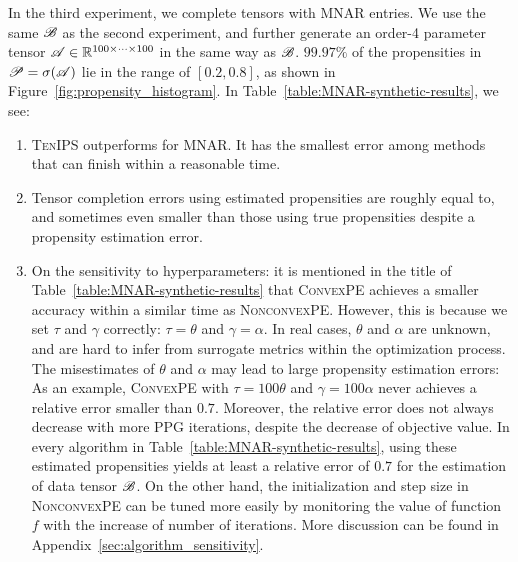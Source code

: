 \documentclass{article}
\newcommand{\T}[2][]{#1\mathscr{\MakeUppercase{#2}}}
\newcommand{\RR}{\mathbb{R}}
\theoremstyle{plain}
\begin{document}
In the third experiment, we complete tensors with MNAR entries. 
We use the same $\T{B}$ as the second experiment, and further generate an order-4 parameter tensor $\T{A} \in \RR^{100 \times \cdots \times 100}$ in the same way as $\T{B}$.
$99.97\%$ of the propensities in $\T{P} = \sigma(\T{A})$ lie in the range of $[0.2, 0.8]$, as shown in Figure~\ref{fig:propensity_histogram}.
In Table~\ref{table:MNAR-synthetic-results}, we see:
\begin{enumerate}[label=\arabic*, wide, labelwidth=!, labelindent=0pt]
	\item \textsc{TenIPS} outperforms for MNAR. 
	It has the smallest error among methods that can finish within a reasonable time.
	\item Tensor completion errors using estimated propensities are roughly equal to, and sometimes even smaller than those using true propensities despite a propensity estimation error. 
	\item On the sensitivity to hyperparameters: it is mentioned in the title of Table~\ref{table:MNAR-synthetic-results} that \textsc{ConvexPE} achieves a smaller accuracy within a similar time as \textsc{NonconvexPE}. 
	However, this is because we set $\tau$ and $\gamma$ correctly: $\tau=\theta$ and $\gamma =\alpha$.
	In real cases, $\theta$ and $\alpha$ are unknown, and are hard to infer from surrogate metrics within the optimization process.
	The misestimates of $\theta$ and $\alpha$ may lead to large propensity estimation errors: As an example, \textsc{ConvexPE} with $\tau=100\theta$ and $\gamma =100\alpha$ never achieves a relative error smaller than $0.7$.
	Moreover, the relative error does not always decrease with more PPG iterations, despite the decrease of objective value.
	In every algorithm in Table~\ref{table:MNAR-synthetic-results}, using these estimated propensities yields at least a relative error of $0.7$ for the estimation of data tensor $\T{B}$.
	On the other hand, the initialization and step size in \textsc{NonconvexPE} can be tuned more easily by monitoring the value of function $f$ with the increase of number of iterations. 
	More discussion can be found in Appendix~\ref{sec:algorithm_sensitivity}.
\end{enumerate}
\end{document}
